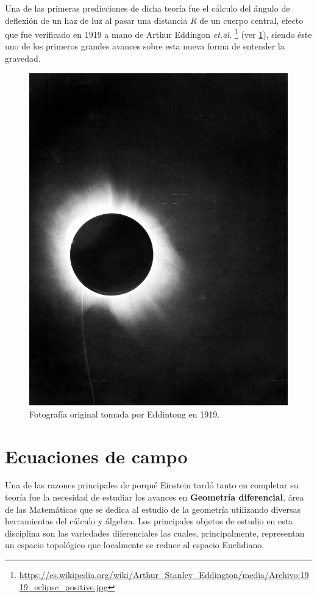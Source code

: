 Una de las primeras predicciones de dicha teoría fue el cálculo del ángulo de deflexión de un haz de luz al pasar una distancia $R$ de un cuerpo central, efecto que fue verificado en 1919 a mano de Arthur Eddingon \textit{et.al.} \footnote{\url{https://es.wikipedia.org/wiki/Arthur_Stanley_Eddington/media/Archivo:1919_eclipse_positive.jpg}} \cite{Coles} (ver \ref{fig:6}), siendo éste uno de los primeros grandes avances sobre esta nueva forma de entender la gravedad.
\begin{figure}[!ht]
\centering
\includegraphics[scale=0.5]{images/1919eclipse.jpg}
\caption[Fotografía tomada por Eddintong]{Fotografía original tomada por Eddintong en 1919.}
\label{fig:6}
\end{figure}

\section{Ecuaciones de campo}
\label{sec:3}

Una de las razones principales de porqué Einstein tardó tanto en completar su teoría fue la necesidad de estudiar los avances en \textbf{Geometría diferencial}, área de las Matemáticas que se dedica al estudio de la geometría utilizando diversas herramientas del cálculo y álgebra. Los principales objetos de estudio en esta disciplina son las variedades diferenciales las cuales, principalmente, representan un espacio topológico que localmente se reduce al espacio Euclidiano.

